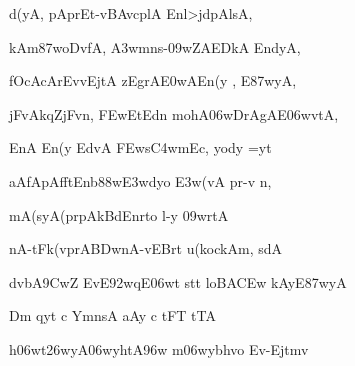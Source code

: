 \ujvers\dnnemsloka 
{\dn d\4(yA, pAprEt-vBAvcplA Enl\0>jdpA\0lsA,}
\dontdisplaylinenum

\dnnemslokab 
{\dn kAm\387woDvfA, \3A3wmns-\309wZAEDkA End\0yA, \dandadn\dontdisplaylinenum}

\dnnemslokac 
{\dn fOcAcArEvvEj\0tA zEgrA\3E0wAEn(y \0, E\387wyA,}
\dontdisplaylinenum

\dnnemslokad 
{\dn jFvAkq\0ZjFvn, \3FEwEtEdn\2 mohA\306wDrAgAE\306wvtA, \vegdn\dontdisplaylinenum}


\ujvers\dnnemsloka 
{\dn EnA En(y EdvA \3FEws\3C4wmEc, yo{\qvb}dy\? =yt\?}
\dontdisplaylinenum

\dnnemslokab 
{\dn aAfApAfft\4En\0b\388w\3E3wdyo \3E3w(vA pr-v\2 n, \dandadn\dontdisplaylinenum}

\dnnemslokac 
{\dn mA(syA\0(prpAkB\?dEnrto l-y \309wrtA}
\dontdisplaylinenum

\dnnemslokad 
{\dn {\rs !\re} nA-tFk(vprA\3BDwnA-vEBrt u(kockAm, sdA \vegdn\dontdisplaylinenum}


\ujvers\dnnemsloka 
{\dn d\?vb\5A\39CwZ EvE\392wqE\306wt stt\2 loBA\3CEw kAy\0E\387wyA}
\dontdisplaylinenum

\dnnemslokab 
{\dn Dm{\rdt} qyt\? c YmnsA aAy{\rdt} c tFT{\rdt} tTA \dandadn\dontdisplaylinenum}

\dnnemslokac 
{\dn h\306wt\326wyA\306wyhtA\396w m\306wybhvo Ev-Ej\0tmv}
\dontdisplaylinenum

